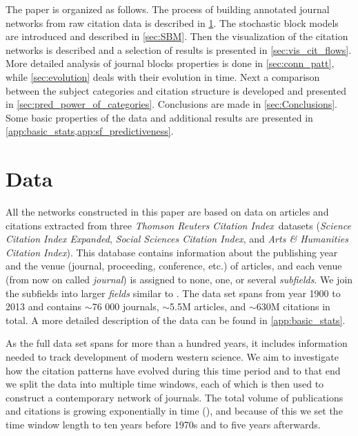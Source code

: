 \documentclass[a4paper,12pt]{article}
\begin{document}
The paper is organized as follows. The process of building annotated journal networks from raw 
citation data is described in \cref{sec:data}.
The stochastic block models are introduced and described in \cref{sec:SBM}. Then the 
visualization of the citation networks is described and a selection of results is presented in \cref{sec:vis_cit_flows}.
More detailed analysis of journal blocks properties is done in \cref{sec:conn_patt},
while \cref{sec:evolution} deals with their evolution in time. Next a comparison between the subject categories and citation structure is developed and presented in \cref{sec:pred_power_of_categories}.
Conclusions are made in \cref{sec:Conclusions}. 
Some basic properties of the data and additional results are presented in \cref{app:basic_stats,app:sf_predictiveness}.


\section{Data}
\label{sec:data}

All the networks constructed in this paper are based on data on articles and citations extracted from three \emph{Thomson Reuters Citation Index}\textsuperscript{\textregistered}~datasets 
(\emph{Science Citation Index Expanded}\texttrademark, \emph{Social Sciences Citation Index}\textsuperscript{\textregistered}, and \emph{Arts \& Humanities Citation Index}\textsuperscript{\textregistered}).
This database contains information about the publishing year and the venue  (journal, 
proceeding, conference, etc.) of articles, and each venue (from now on called \emph{journal}) is assigned 
to none, one, or several  \emph{subfields}. We join the subfields into larger \emph{fields} similar to \citet{Parolo2015}. The data set spans from  year 1900 to 2013 and contains $\sim$76 000 journals, $\sim$5.5M articles, and $\sim$630M citations in total. A more detailed description of the data can be found in \cref{app:basic_stats}.

As the full data set spans for more than a hundred years, it includes information needed to track development of modern western science. We aim to investigate how the citation patterns have evolved during this time period and to that end we split the data into multiple time windows, 
each of which is then used to construct a contemporary network of journals. The total volume of publications and citations is growing exponentially in 
time (\citealt{Pan2016arXiv}), and because of this we set the time window length to ten years before 1970s and to five years afterwards.
\end{document}
